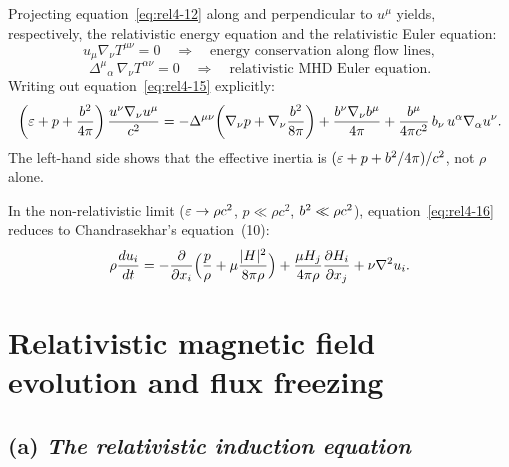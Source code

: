 Projecting equation~\eqref{eq:rel4-12} along and perpendicular to
$u^{\mu}$ yields, respectively, the relativistic energy equation and the
relativistic Euler equation:
\begin{equation}\label{eq:rel4-14}
  u_{\mu}\nabla_{\nu}T^{\mu\nu} = 0 \quad \Longrightarrow \quad
  \text{energy conservation along flow lines},
\end{equation}
\begin{equation}\label{eq:rel4-15}
  \Delta^{\mu}{}_{\alpha}\,\nabla_{\nu}T^{\alpha\nu} = 0
  \quad \Longrightarrow \quad
  \text{relativistic MHD Euler equation}.
\end{equation}
Writing out equation~\eqref{eq:rel4-15} explicitly:
\begin{equation}\label{eq:rel4-16}
  \left(\edensity + p + \frac{\bsq}{4\pi}\right)
    \frac{u^{\nu}\nabla_{\nu}u^{\mu}}{c^{2}}
  = -\Delta^{\mu\nu}\!\left(\nabla_{\nu}p
    + \nabla_{\nu}\frac{\bsq}{8\pi}\right)
    + \frac{b^{\nu}\nabla_{\nu}b^{\mu}}{4\pi}
    + \frac{b^{\mu}}{4\pi c^{2}}\,b_{\nu}\,
      u^{\alpha}\nabla_{\alpha}u^{\nu}.
\end{equation}
The left-hand side shows that the effective inertia is
$(\edensity+p+\bsq/4\pi)/c^{2}$, not $\rho$ alone.

\begin{relcorrection}
In the non-relativistic limit ($\edensity\to\rho c^{2}$, $p\ll\rho c^{2}$,
$\bsq\ll\rho c^{2}$), equation~\eqref{eq:rel4-16} reduces to
Chandrasekhar's equation~(10):
\[
  \rho\frac{du_{i}}{dt} = -\frac{\partial}{\partial x_{i}}
    \Bigl(\frac{p}{\rho}+\mu\frac{|\mathbf{H}|^{2}}{8\pi\rho}\Bigr)
    + \frac{\mu H_{j}}{4\pi\rho}\frac{\partial H_{i}}{\partial x_{j}}
    + \nu\nabla^{2}u_{i}.
\]
\end{relcorrection}


\section{Relativistic magnetic field evolution and flux freezing}
\label{sec:rel38}

\subsection*{(a) \emph{The relativistic induction equation}}

